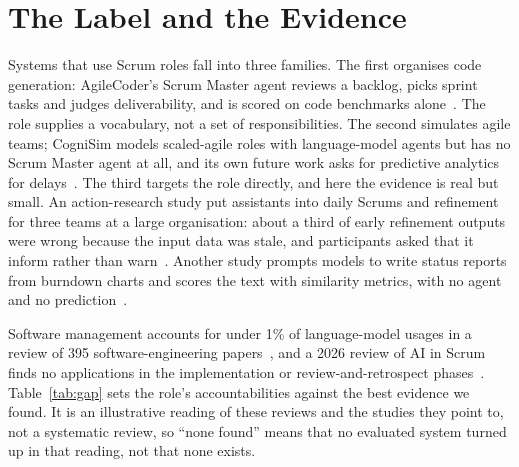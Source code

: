 \documentclass[conference]{IEEEtran}
\begin{document}
\section{The Label and the Evidence}
\label{sec:gap}

Systems that use Scrum roles fall into three families. The first organises code generation: AgileCoder's Scrum Master agent reviews a backlog, picks sprint tasks and judges deliverability, and is scored on code benchmarks alone~\cite{agilecoder}. The role supplies a vocabulary, not a set of responsibilities. The second simulates agile teams; CogniSim models scaled-agile roles with language-model agents but has no Scrum Master agent at all, and its own future work asks for predictive analytics for delays~\cite{cognisim}. The third targets the role directly, and here the evidence is real but small. An action-research study put assistants into daily Scrums and refinement for three teams at a large organisation: about a third of early refinement outputs were wrong because the input data was stale, and participants asked that it inform rather than warn~\cite{cabrero}. Another study prompts models to write status reports from burndown charts and scores the text with similarity metrics, with no agent and no prediction~\cite{alliata}.

Software management accounts for under 1\% of language-model usages in a review of 395 software-engineering papers~\cite{hou}, and a 2026 review of AI in Scrum finds no applications in the implementation or review-and-retrospect phases~\cite{peras}. Table~\ref{tab:gap} sets the role's accountabilities against the best evidence we found. It is an illustrative reading of these reviews and the studies they point to, not a systematic review, so ``none found'' means that no evaluated system turned up in that reading, not that none exists.
\end{document}
